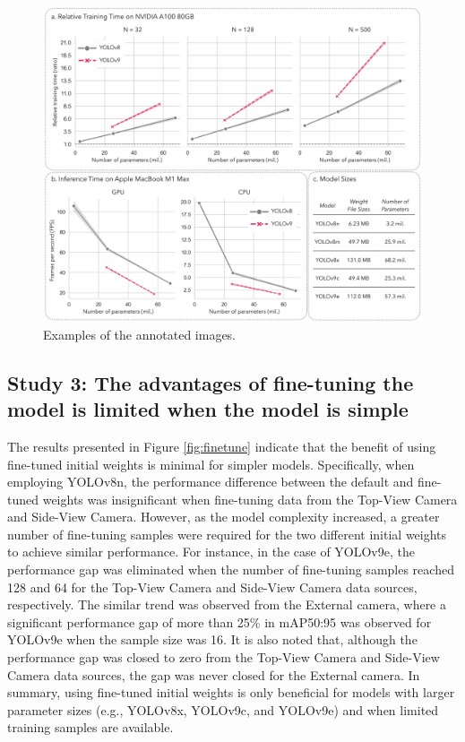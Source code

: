 \begin{figure}[H]
    \centering
    \includegraphics[width=1\textwidth]{figure_6.jpg}
    \caption{Examples of the annotated images.}
    \label{fig:resources}
\end{figure}


\subsection*{Study 3: The advantages of fine-tuning the model is limited when the model is simple}

The results presented in Figure \ref{fig:finetune} indicate that the benefit of using fine-tuned initial weights is minimal for simpler models. Specifically, when employing YOLOv8n, the performance difference between the default and fine-tuned weights was insignificant when fine-tuning data from the Top-View Camera and Side-View Camera. However, as the model complexity increased, a greater number of fine-tuning samples were required for the two different initial weights to achieve similar performance. For instance, in the case of YOLOv9e, the performance gap was eliminated when the number of fine-tuning samples reached 128 and 64 for the Top-View Camera and Side-View Camera data sources, respectively. The similar trend was observed from the External camera, where a significant performance gap of more than 25\% in mAP50:95 was observed for YOLOv9e when the sample size was 16. It is also noted that, although the performance gap was closed to zero from the Top-View Camera and Side-View Camera data sources, the gap was never closed for the External camera. In summary, using fine-tuned initial weights is only beneficial for models with larger parameter sizes (e.g., YOLOv8x, YOLOv9c, and YOLOv9e) and when limited training samples are available.

